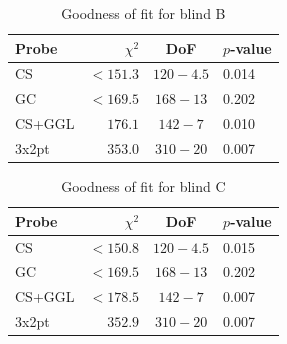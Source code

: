 \begin{table}
	\begin{center}
		\caption{Goodness of fit for blind B}
		\label{tab:goodness-of-fitB}
\begin{tabular}{lrcl}
    \toprule
    Probe             & $\chi^2$       & DoF       & $p$-value   \\
    \midrule
	CS               & $< 151.3$ & $120-4.5$ & 0.014 \\
	GC               & $< 169.5$ & $168-13$ & 0.202 \\
	CS+GGL           & $176.1$ & $142-7$ & 0.010 \\
	3x2pt            & $353.0$ & $310-20$ & 0.007 \\

    \bottomrule
\end{tabular}
	\end{center}
\end{table}

\begin{table}
	\begin{center}
		\caption{Goodness of fit for blind C}
		\label{tab:goodness-of-fitC}
\begin{tabular}{lrcl}
    \toprule
    Probe             & $\chi^2$       & DoF       & $p$-value   \\
    \midrule
	CS               & $< 150.8$ & $120-4.5$ & 0.015 \\
	GC               & $< 169.5$ & $168-13$ & 0.202 \\
	CS+GGL           & $< 178.5$ & $142-7$ & 0.007 \\
	3x2pt            & $352.9$ & $310-20$ & 0.007 \\

    \bottomrule
\end{tabular}
	\end{center}
\end{table}
